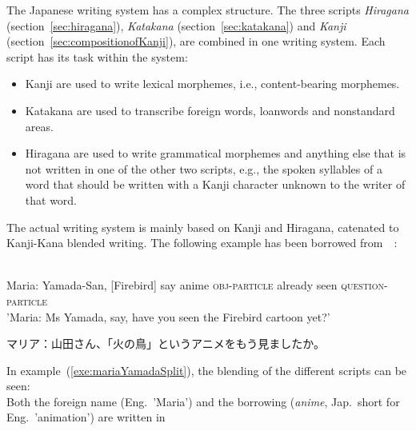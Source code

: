 The Japanese writing system has a complex structure. The three scripts 
\emph{Hiragana} (section~\ref{sec:hiragana}),
\emph{Katakana} (section~\ref{sec:katakana}) and
\emph{Kanji} (section~\ref{sec:compositionofKanji}),
are combined in one writing system. Each script has its task within the system:
\begin{itemize}

  \item Kanji are used to write lexical morphemes, i.e., content-bearing morphemes.

  \item Katakana are used to transcribe foreign words, loanwords and 
        nonstandard areas.

  \item Hiragana are used to write grammatical morphemes and anything else that
        is not written in one of the other two scripts, e.g., the spoken syllables
        of a word that should be written with a Kanji character unknown to the 
        writer of that word.
\end{itemize}
The actual writing system is mainly based on Kanji and Hiragana, catenated to
Kanji-Kana blended writing.
The following example has been borrowed 
from~~\citeyear{Katsuki2006Book}:
\begin{exe}
\ex\label{exe:mariaYamada}
\begin{xlist}
\ex \label{exe:mariaYamadaSplit}
\gll 
  \\
 Maria: Yamada-San, [Firebird] say anime \textsc{obj-particle} already seen \textsc{question-particle} \\
\trans 'Maria: Ms Yamada, say, have you seen the Firebird cartoon yet?' \\
\ex\label{exe:mariaYamadaFull}
 \begin{CJK} 
  マリア：山田さん、「火の鳥」というアニメをもう見ましたか。
 \end{CJK}
\end{xlist}
\end{exe}
In example~(\ref{exe:mariaYamadaSplit}), the blending of the different scripts 
can be seen:\\
Both the foreign name   (Eng.\ 'Maria') and the borrowing 
 (\emph{anime}, Jap.\ short for Eng.\ 'animation') are written in 
